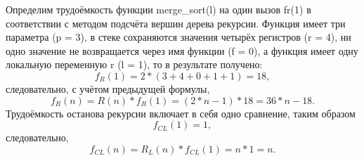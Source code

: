 \documentclass[12pt,a4paper]{scrartcl}
\begin{document}
Определим трудоёмкость функции merge\_sort(l) на один вызов fr(1) в соответствии  с методом подсчёта вершин дерева рекурсии. Функция имеет три параметра (p = 3), в стеке сохраняются значения четырёх регистров (r = 4), ни одно значение не возвращается через имя функции (f = 0), а функция имеет одну локальную переменную r (l = 1), то в результате получено:
\begin{equation}\label{eq2.8}
f_R(1) = 2*(3 + 4 + 0 + 1 + 1) = 18,
\end{equation}
следовательно, с учётом предыдущей формулы,
\begin{equation}\label{eq2.9}
f_R(n) = R(n)*f_R(1) = (2*n - 1)*18 = 36*n - 18.
\end{equation}
Трудоёмкость останова рекурсии включает в себя одно сравнение, таким образом 
\begin{equation*}
f_{CL}(1) = 1,
\end{equation*}
следовательно,
\begin{equation}\label{eq2.10}
f_{CL}(n) = R_L(n)*f_{CL}(1) = n*1 = n.
\end{equation}
\end{document}
